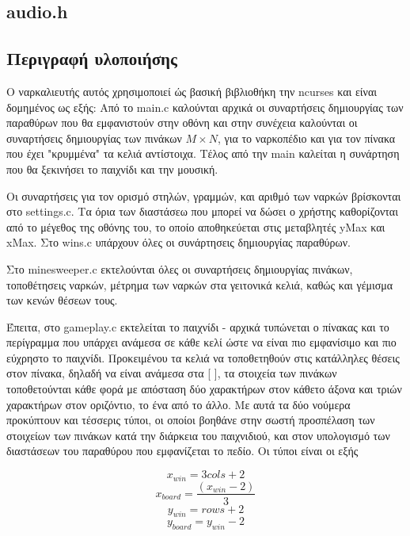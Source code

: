 \documentclass{article}
\begin{document}
    \subsection{audio.h}
        

    \subsection{Περιγραφή υλοποιήσης}

    Ο ναρκαλιευτής αυτός χρησιμοποιεί ώς βασική βιβλιοθήκη την ncurses και είναι δομημένος ως εξής:
    Από το main.c καλούνται αρχικά οι συναρτήσεις δημιουργίας των παραθύρων που θα εμφανιστούν
    στην οθόνη και στην συνέχεια καλούνται οι συναρτήσεις δημιουργίας των πινάκων $Μ \times N$,
    για το ναρκοπέδιο και για τον πίνακα που έχει "κρυμμένα" τα κελιά αντίστοιχα.
    Τέλος από την main καλείται η συνάρτηση που θα ξεκινήσει το παιχνίδι και την μουσική.  

    Οι συναρτήσεις για τον ορισμό στηλών, γραμμών, και αριθμό των ναρκών βρίσκονται στο settings.c.
    Τα όρια των διαστάσεω που μπορεί να δώσει ο χρήστης καθορίζονται από το μέγεθος της οθόνης του, το
    οποίο αποθηκεύεται στις μεταβλητές yMax και xMax. Στο wins.c υπάρχουν όλες οι συνάρτησεις δημιουργίας παραθύρων.  

    Στο minesweeper.c εκτελούνται όλες οι συναρτήσεις δημιουργίας πινάκων, τοποθέτησεις ναρκών,
    μέτρημα των ναρκών στα γειτονικά κελιά, καθώς και γέμισμα των κενών θέσεων τους.  

    Έπειτα, στο gameplay.c εκτελείται το παιχνίδι - αρχικά τυπώνεται ο πίνακας και το περίγραμμα που
    υπάρχει ανάμεσα σε κάθε κελί ώστε να είναι πιο εμφανίσιμο και πιο εύχρηστο το παιχνίδι. Προκειμένου
    τα κελιά να τοποθετηθούν στις κατάλληλες θέσεις στον πίνακα, δηλαδή να είναι ανάμεσα στα [ ],
    τα στοιχεία των πινάκων τοποθετούνται κάθε φορά με απόσταση δύο χαρακτήρων στον κάθετο άξονα και 
    τριών χαρακτήρων στον οριζόντιο, το ένα από το άλλο. Με αυτά τα δύο νούμερα προκύπτουν και τέσσερις 
    τύποι, οι οποίοι βοηθάνε στην σωστή προσπέλαση των στοιχείων των πινάκων κατά την διάρκεια του παιχνιδιού,
    και στον υπολογισμό των διαστάσεων του παραθύρου που εμφανίζεται το πεδίο. Οι τύποι είναι οι εξής

    \begin{equation}
        x_{win} = 3cols + 2
    \end{equation}
    \begin{equation}
        x_{board} = \frac{(x_{win}-2)}{3}
    \end{equation}
    \begin{equation}
        y_{win} = rows + 2
    \end{equation}
    \begin{equation}
        y_{board} = y_{win}-2
    \end{equation}
\end{document}

